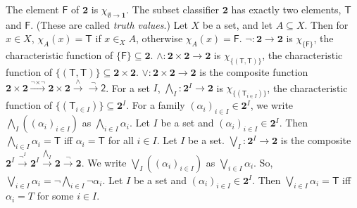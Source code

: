  The element $\mathsf{F}$ of $\mathbf{2}$ is $\chi_{\emptyset \to \mathbf{1}}$.
 The subset classifier $\mathbf{2}$ has exactly two elements, $\mathsf{T}$ and $\mathsf{F}$. (These are called \textit{truth values}.)
 Let $X$ be a set, and let $A \subseteq X$. Then for $x \in X$, $\chi_A(x) = \mathsf{T}$ if $x \in_X A$, otherwise $\chi_A(x) = \mathsf{F}$.
 $\neg \colon \mathbf{2} \to \mathbf{2}$ is $\chi_{\{\mathsf{F}\}}$, the characteristic function of $\{\mathsf{F}\} \subseteq \mathbf{2}$.
 $\wedge \colon \mathbf{2} \times \mathbf{2} \to \mathbf{2}$ is $\chi_{\{(\mathsf{T}, \mathsf{T})\}}$, the characteristic function of $\{(\mathsf{T}, \mathsf{T})\} \subseteq \mathbf{2} \times \mathbf{2}$.
 $\vee \colon \mathbf{2} \times \mathbf{2} \to \mathbf{2}$ is the composite function $\mathbf{2} \times \mathbf{2} \xrightarrow{\neg \times \neg} \mathbf{2} \times \mathbf{2} \xrightarrow{\wedge} \xrightarrow{\neg} \mathsf{2}$.
 For a set $I$, $\bigwedge_I \colon \mathbf{2}^I \to \mathbf{2}$ is $\chi_{\{(\mathsf{T}_{i \in I})\}}$, the characteristic function of $\{(\mathsf{T}_{i \in I})\} \subseteq \mathbf{2}^I$. For a family $(\alpha_i)_{i \in I} \in \mathbf{2}^I$, we write $\bigwedge_I((\alpha_i)_{i \in I})$ as $\bigwedge_{i \in I} \alpha_i$.
 Let $I$ be a set and $(\alpha_i)_{i \in I} \in \mathbf{2}^I$. Then $\bigwedge_{i \in I} \alpha_i = \mathsf{T}$ iff $\alpha_i = \mathsf{T}$ for all $i \in I$.
 Let $I$ be a set. $\bigvee_I \colon \mathbf{2}^I \to \mathbf{2}$ is the composite $\mathbf{2}^I \xrightarrow{\neg^I} \mathbf{2}^I \xrightarrow{\bigwedge_I} \mathbf{2} \xrightarrow{\neg} \mathbf{2}$. We write $\bigvee_I((\alpha_i)_{i \in I})$ as $\bigvee_{i \in I} \alpha_i$. So, $\bigvee_{i \in I} \alpha_i = \neg \bigwedge_{i \in I} \neg \alpha_i$.
 Let $I$ be a set and $(\alpha_i)_{i \in I} \in \mathbf{2}^I$. Then $\bigvee_{i \in I} \alpha_i = \mathsf{T}$ iff $\alpha_i = T$ for some $i \in I$.
